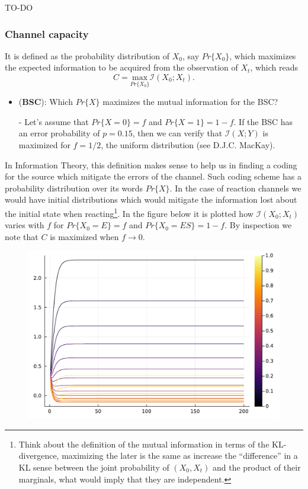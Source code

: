\documentclass[11pt]{amsart}
\begin{document}
TO-DO

\subsubsection{Channel capacity}
It is defined as the probability distribution of $X_0$, say $Pr\{X_0\}$, which maximizes the expected information to be acquired from the observation of $X_t$, which reads
$$C = \underset{Pr\{X_0\}}{\text{max}} \mathcal{I}(X_0;X_t).$$

\begin{itemize}
\item ({\bf BSC}): Which $Pr\{X\}$ maximizes the mutual information for the BSC?
\item[-] Let's assume that $Pr\{X = 0\} = f$ and $Pr\{X = 1\} = 1-f$. If the BSC has an error probability of $p=0.15$, then we can verify that $\mathcal{I}(X;Y)$ is maximized for $f=1/2$, the uniform distribution (see D.J.C. MacKay).

\end{itemize}


In Information Theory, this definition makes sense to help us in finding a coding for the source which mitigate the errors of the channel. Such coding scheme has a probability distribution over its words $Pr\{X\}$. In the case of reaction channels we would have initial distributions which would mitigate the information lost about the initial state when reacting\footnote{Think about the definition of the mutual information in terms of the KL-divergence, maximizing the later is the same as increase the ``difference'' in a KL sense between the joint probability of $(X_0,X_t)$ and the product of their marginals, what would imply that they are independent.}. In the figure below it is plotted how $\mathcal{I}(X_0;X_t)$ varies with $f$ for $Pr\{X_0 = E\} = f$ and $Pr\{X_0 = ES\} = 1-f$. By inspection we note that $C$ is maximized when $f \rightarrow 0$.

\begin{figure}[h]
\includegraphics[scale=.5]{I_mutual}
\end{figure}
\end{document}
